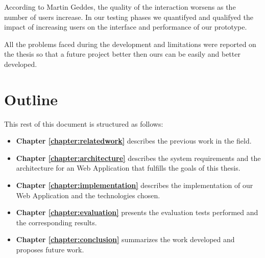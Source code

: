         
	According to Martin Geddes, the quality of the interaction worsens as the number of users increase\cite{geddes}. In our testing phases we quantifyed and qualifyed the impact of increasing users on the interface and performance of our prototype. 

	All the problems faced during the development and limitations were reported on the thesis so that a future project better then ours can be easily and better developed.


\section{Outline}

This rest of this document is structured as follows:

\begin{itemize}
\item \textbf{Chapter \ref{chapter:relatedwork}} describes the previous work in the field.
\item \textbf{Chapter \ref{chapter:architecture}} describes the system requirements and the architecture for an Web Application that fulfills the goals of this thesis.
\item \textbf{Chapter \ref{chapter:implementation}} describes the implementation of our Web Application and the technologies chosen.
\item \textbf{Chapter \ref{chapter:evaluation}} presents the evaluation tests performed and the corresponding results.
\item \textbf{Chapter \ref{chapter:conclusion}} summarizes the work developed and proposes future work.
\end{itemize}

\cleardoublepage
